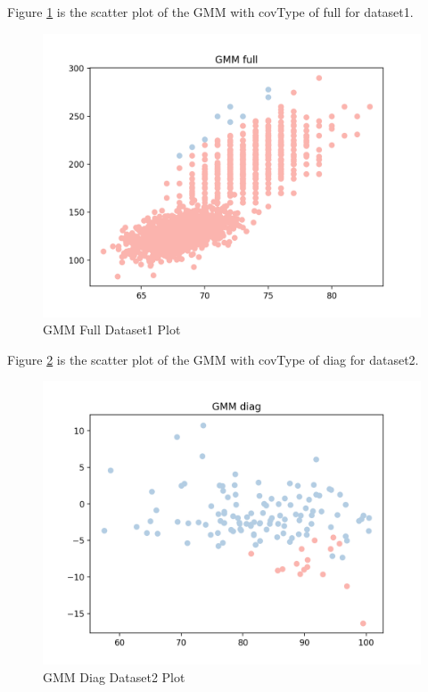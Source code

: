 \documentclass[11pt]{article}
\begin{document}
\begin{enumerate}
Figure \ref{fig:gmm_full_1} is the scatter plot of the GMM with covType of full for dataset1.

\begin{figure}[!h]
  \centering
  \includegraphics[width=\linewidth]{figures/gmm_full_1.png}
  \caption{GMM Full Dataset1 Plot}
  \label{fig:gmm_full_1}
\end{figure}

Figure \ref{fig:gmm_diag_2} is the scatter plot of the GMM with covType of diag for dataset2.

\begin{figure}[!h]
  \centering
  \includegraphics[width=\linewidth]{figures/gmm_diag_2.png}
  \caption{GMM Diag Dataset2 Plot}
  \label{fig:gmm_diag_2}
\end{figure}


\end{enumerate}
\end{document}
